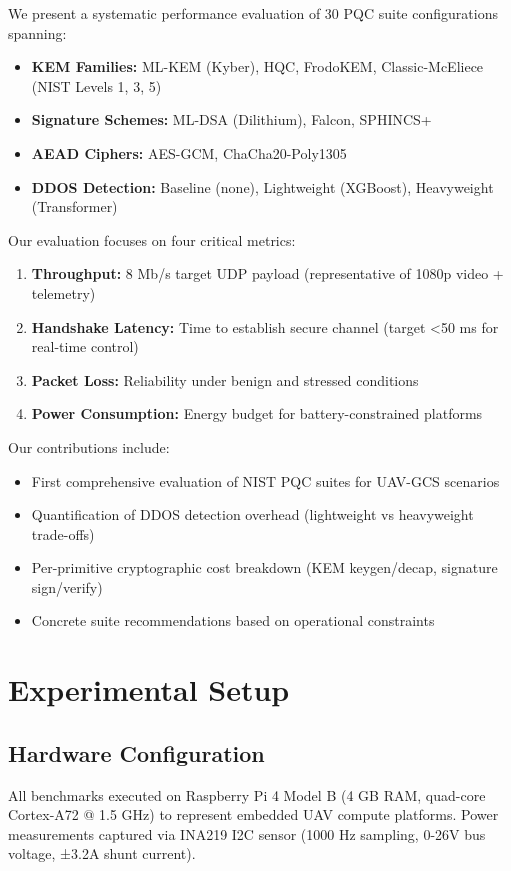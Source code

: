 \documentclass[11pt,a4paper]{article}
\begin{document}
We present a systematic performance evaluation of 30 PQC suite configurations spanning:
\begin{itemize}
    \item \textbf{KEM Families:} ML-KEM (Kyber), HQC, FrodoKEM, Classic-McEliece (NIST Levels 1, 3, 5)
    \item \textbf{Signature Schemes:} ML-DSA (Dilithium), Falcon, SPHINCS+
    \item \textbf{AEAD Ciphers:} AES-GCM, ChaCha20-Poly1305
    \item \textbf{DDOS Detection:} Baseline (none), Lightweight (XGBoost), Heavyweight (Transformer)
\end{itemize}

Our evaluation focuses on four critical metrics:
\begin{enumerate}
    \item \textbf{Throughput:} 8 Mb/s target UDP payload (representative of 1080p video + telemetry)
    \item \textbf{Handshake Latency:} Time to establish secure channel (target <50 ms for real-time control)
    \item \textbf{Packet Loss:} Reliability under benign and stressed conditions
    \item \textbf{Power Consumption:} Energy budget for battery-constrained platforms
\end{enumerate}

Our contributions include:
\begin{itemize}
    \item First comprehensive evaluation of NIST PQC suites for UAV-GCS scenarios
    \item Quantification of DDOS detection overhead (lightweight vs heavyweight trade-offs)
    \item Per-primitive cryptographic cost breakdown (KEM keygen/decap, signature sign/verify)
    \item Concrete suite recommendations based on operational constraints
\end{itemize}

\section{Experimental Setup}

\subsection{Hardware Configuration}
All benchmarks executed on Raspberry Pi 4 Model B (4 GB RAM, quad-core Cortex-A72 @ 1.5 GHz) to represent embedded UAV compute platforms. Power measurements captured via INA219 I2C sensor (1000 Hz sampling, 0-26V bus voltage, ±3.2A shunt current).
\end{document}
